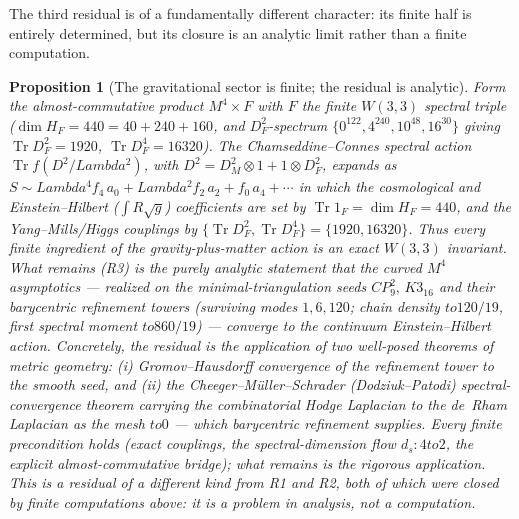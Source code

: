 \documentclass[12pt,a4paper]{article}
\def\mathrm#1{#1}%
\def\Lambda{Lambda}%
\def\to{ to }%
\newtheorem{proposition}[theorem]{Proposition}
\theoremstyle{definition}
\begin{document}
The third residual is of a fundamentally different character: its finite half
is entirely determined, but its closure is an analytic limit rather than a
finite computation.

\begin{proposition}[The gravitational sector is finite; the residual is analytic]
\label{prop:r3-residual}
Form the almost-commutative product $M^4\times F$ with $F$ the finite $W(3,3)$
spectral triple ($\dim H_F=440=40+240+160$, and $D_F^2$-spectrum
$\{0^{122},4^{240},10^{48},16^{30}\}$ giving $\operatorname{Tr}D_F^2=1920$,
$\operatorname{Tr}D_F^4=16320$). The Chamseddine--Connes spectral action
$\operatorname{Tr}f(D^2/\Lambda^2)$, with $D^2=D_M^2\otimes1+1\otimes D_F^2$,
expands as $S\sim \Lambda^4 f_4\,a_0+\Lambda^2 f_2\,a_2+f_0\,a_4+\cdots$ in
which the cosmological and Einstein--Hilbert ($\int R\sqrt g$) coefficients are
set by $\operatorname{Tr}1_F=\dim H_F=440$, and the Yang--Mills/Higgs couplings
by $\{\operatorname{Tr}D_F^2,\operatorname{Tr}D_F^4\}=\{1920,16320\}$. Thus
\emph{every finite ingredient of the gravity-plus-matter action is an exact
$W(3,3)$ invariant}. What remains (R3) is the purely \emph{analytic} statement
that the curved $M^4$ asymptotics --- realized on the minimal-triangulation
seeds $\mathrm{CP}^2_9,\,K3_{16}$ and their barycentric refinement towers
(surviving modes $1,6,120$; chain density $\to 120/19$, first spectral moment
$\to 860/19$) --- converge to the continuum Einstein--Hilbert action.
Concretely, the residual is the application of two well-posed theorems of
metric geometry: \emph{(i)} Gromov--Hausdorff convergence of the refinement
tower to the smooth seed, and \emph{(ii)} the Cheeger--M\"uller--Schrader
(Dodziuk--Patodi) spectral-convergence theorem carrying the combinatorial
Hodge Laplacian to the de~Rham Laplacian as the mesh $\to 0$ --- which
barycentric refinement supplies. Every finite precondition holds (exact
couplings, the spectral-dimension flow $d_s\!:4\!\to\!2$, the explicit
almost-commutative bridge); what remains is the rigorous application. This is a
residual of a different kind from R1 and R2, both of which were closed by
finite computations above: it is a problem in analysis, not a computation.
\end{proposition}
\end{document}
